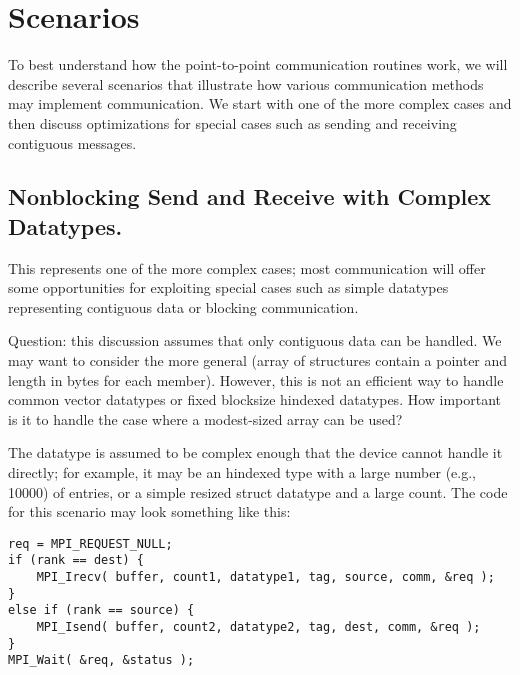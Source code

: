\section{Scenarios}
\label{sec:pt-2-pt-scenarios}

To best understand how the point-to-point communication routines work, we will
describe several scenarios that illustrate how various communication methods
may implement communication.  We start with one of the more complex cases and
then discuss optimizations for special cases such as sending and receiving
contiguous messages.

\subsection{Nonblocking Send and Receive with Complex Datatypes.}
This represents one of the more complex cases; most communication will offer
some opportunities for exploiting special cases such as simple datatypes
representing contiguous data or blocking communication.  

Question: this discussion assumes that only contiguous data can be handled.
We may want to consider the more general  (array of structures
contain a pointer and length in bytes for each member).  However, this is not
an efficient way to handle common vector datatypes or fixed blocksize hindexed
datatypes.  How important is it to handle the case where a modest-sized
 array can be used?  

The datatype is assumed to be complex enough that the device cannot handle it
directly; for example, it may be an hindexed type with a large number (e.g.,
10000) of entries, or a simple resized struct datatype and a large count.
The code for this scenario may look something like this:
\begin{verbatim}
req = MPI_REQUEST_NULL;
if (rank == dest) {
    MPI_Irecv( buffer, count1, datatype1, tag, source, comm, &req );
}
else if (rank == source) {
    MPI_Isend( buffer, count2, datatype2, tag, dest, comm, &req );
}
MPI_Wait( &req, &status );
\end{verbatim}



